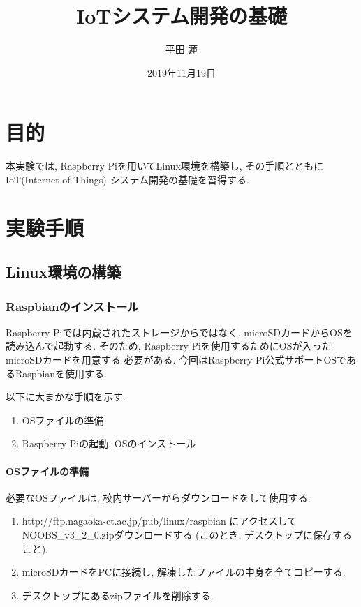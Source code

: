 \documentclass[titlepage]{jsarticle}
\title{IoTシステム開発の基礎}
\author{平田 蓮}
\date{2019年11月19日}
\begin{document}
\maketitle
\section{目的}
    本実験では, Raspberry Piを用いてLinux環境を構築し, その手順とともにIoT(Internet of Things)
    システム開発の基礎を習得する.

\section{実験手順}
    \subsection{Linux環境の構築}
        \subsubsection{Raspbianのインストール}
            Raspberry Piでは内蔵されたストレージからではなく,
            microSDカードからOSを読み込んで起動する.
            そのため, Raspberry Piを使用するためにOSが入ったmicroSDカードを用意する
            必要がある. 今回はRaspberry Pi公式サポートOSであるRaspbianを使用する.

            以下に大まかな手順を示す.

            \begin{enumerate}
                \item OSファイルの準備
                \item Raspberry Piの起動, OSのインストール
            \end{enumerate}

            \paragraph{OSファイルの準備}
                必要なOSファイルは, 校内サーバーからダウンロードをして使用する.

                \begin{enumerate}
                    \item http://ftp.nagaoka-ct.ac.jp/pub/linux/raspbian
                        にアクセスしてNOOBS\_v3\_2\_0.zipダウンロードする
                        (このとき, デスクトップに保存すること).
                    \item microSDカードをPCに接続し, 解凍したファイルの中身を全てコピーする.
                    \item デスクトップにあるzipファイルを削除する.
                \end{enumerate}
\end{document}
